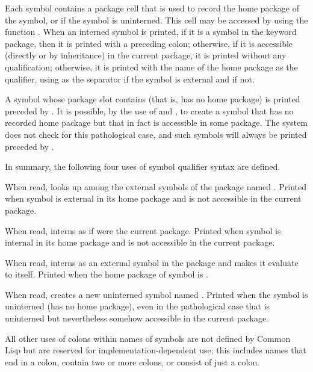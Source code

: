 Each symbol contains a package cell that is used to record the home
package of the symbol, or {\false} if the symbol is uninterned.  This cell
may be accessed by using the function .
When an interned
symbol is printed, if it is a symbol in the keyword package,
then it is printed with a preceding colon; otherwise, if it is accessible
(directly or by inheritance) in the current package, it is printed
without any qualification; otherwise, it is printed with the name of the
home package as the qualifier, using \cd{:} as the separator if the
symbol is external and \cd{::} if not.

A symbol whose package slot contains {\false} (that is, has no home
package)
is printed preceded by \cd{\#:}.  It is possible, by the
use of  and , to create a symbol that has no
recorded home package but that in fact is accessible in some package.
The system does not check for this pathological case, and such symbols
will always be printed preceded by \cd{\#:}.

In summary, the following four uses of symbol qualifier syntax are defined.

\begin{flushdesc}
\item[\cd{foo:bar}]
When read, looks up  among the external symbols of
the package named .  Printed when symbol  is external in its
home package  and is not accessible in the current package.

\item[\cd{foo::bar}]
When read, interns  as if  were the
current package.  Printed when symbol  is internal in its home package
 and is not accessible in the current package.

\item[\cd{:bar}]
When read, interns  as an external symbol in the
 package and makes it evaluate to itself.  Printed when
the home package of symbol  is .
    
\item[\cd{\#:bar}]
When read, creates a new uninterned symbol named .
Printed when the symbol  is uninterned (has no home package),
even in the pathological case that  is uninterned but
nevertheless somehow accessible in the current package.
\end{flushdesc}

All other uses of colons within names of symbols are not defined by
Common Lisp but are reserved for implementation-dependent use; this
includes names that end in a colon, contain two or more colons, or
consist of just a colon.

